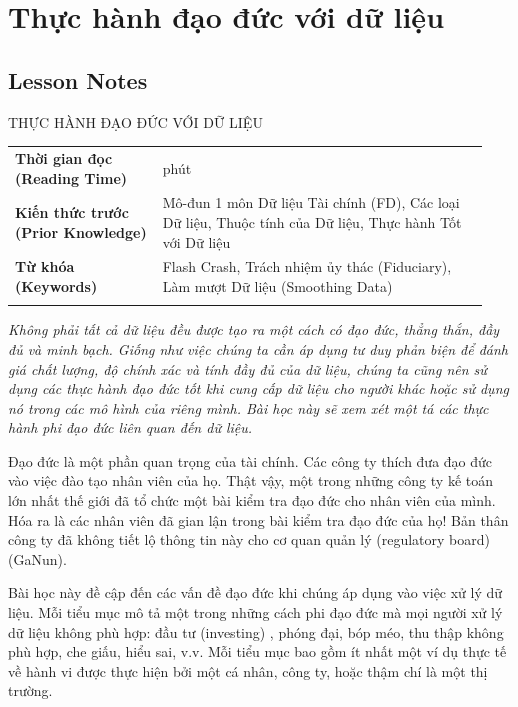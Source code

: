 \chapter{Thực hành đạo đức với dữ liệu}
\label{ch:M2L4}


\section*{Lesson Notes}

THỰC HÀNH ĐẠO ĐỨC VỚI DỮ LIỆU

{\small
\begin{longtable}{>{\raggedright\arraybackslash}p{0.292\linewidth}>{\raggedright\arraybackslash}p{0.648\linewidth}}
\toprule
\textbf{Thời gian đọc (Reading Time)} & 20 phút \\
\addlinespace[2pt]
\textbf{Kiến thức trước (Prior Knowledge)} & Mô-đun 1 môn Dữ liệu Tài chính (FD), Các loại Dữ liệu, Thuộc tính của Dữ liệu, Thực hành Tốt với Dữ liệu \\
\addlinespace[2pt]
\textbf{Từ khóa (Keywords)} & Flash Crash, Trách nhiệm ủy thác (Fiduciary), Làm mượt Dữ liệu (Smoothing Data) \\
\addlinespace[2pt]
\bottomrule
\end{longtable}
}

\emph{Không phải tất cả dữ liệu đều được tạo ra một cách có đạo đức, thẳng thắn, đầy đủ và minh bạch. Giống như việc chúng ta cần áp dụng tư duy phản biện để đánh giá chất lượng, độ chính xác và tính đầy đủ của dữ liệu, chúng ta cũng nên sử dụng các thực hành đạo đức tốt khi cung cấp dữ liệu cho người khác hoặc sử dụng nó trong các mô hình của riêng mình. Bài học này sẽ xem xét một tá các thực hành phi đạo đức liên quan đến dữ liệu.}

Đạo đức là một phần quan trọng của tài chính. Các công ty thích đưa đạo đức vào việc đào tạo nhân viên của họ. Thật vậy, một trong những công ty kế toán lớn nhất thế giới đã tổ chức một bài kiểm tra đạo đức cho nhân viên của mình. Hóa ra là các nhân viên đã gian lận trong bài kiểm tra đạo đức của họ! Bản thân công ty đã không tiết lộ thông tin này cho cơ quan quản lý (regulatory board) (GaNun).

Bài học này đề cập đến các vấn đề đạo đức khi chúng áp dụng vào việc xử lý dữ liệu. Mỗi tiểu mục mô tả một trong những cách phi đạo đức mà mọi người xử lý dữ liệu không phù hợp: đầu tư (investing) , phóng đại, bóp méo, thu thập không phù hợp, che giấu, hiểu sai, v.v. Mỗi tiểu mục bao gồm ít nhất một ví dụ thực tế về hành vi được thực hiện bởi một cá nhân, công ty, hoặc thậm chí là một thị trường.

